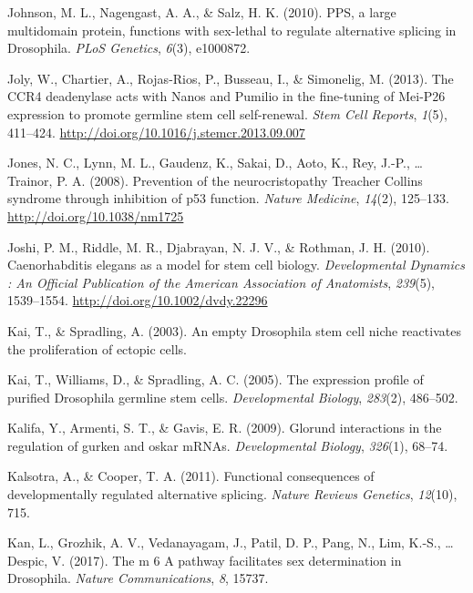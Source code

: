 \documentclass[12pt,twoside]{reedthesis}
\newlength{\cslhangindent}
\newenvironment{cslreferences}%
  {\setlength{\parindent}{0pt}%
  \everypar{\setlength{\hangindent}{\cslhangindent}}\ignorespaces}%
  {\par}
\begin{document}
\begin{cslreferences}
\leavevmode\hypertarget{ref-Johnson2010}{}%
Johnson, M. L., Nagengast, A. A., \& Salz, H. K. (2010). PPS, a large multidomain protein, functions with sex-lethal to regulate alternative splicing in Drosophila. \emph{PLoS Genetics}, \emph{6}(3), e1000872.

\leavevmode\hypertarget{ref-Joly2013f}{}%
Joly, W., Chartier, A., Rojas-Rios, P., Busseau, I., \& Simonelig, M. (2013). The CCR4 deadenylase acts with Nanos and Pumilio in the fine-tuning of Mei-P26 expression to promote germline stem cell self-renewal. \emph{Stem Cell Reports}, \emph{1}(5), 411--424. \url{http://doi.org/10.1016/j.stemcr.2013.09.007}

\leavevmode\hypertarget{ref-jonesPreventionNeurocristopathyTreacher2008}{}%
Jones, N. C., Lynn, M. L., Gaudenz, K., Sakai, D., Aoto, K., Rey, J.-P., \ldots{} Trainor, P. A. (2008). Prevention of the neurocristopathy Treacher Collins syndrome through inhibition of p53 function. \emph{Nature Medicine}, \emph{14}(2), 125--133. \url{http://doi.org/10.1038/nm1725}

\leavevmode\hypertarget{ref-Joshi2010l}{}%
Joshi, P. M., Riddle, M. R., Djabrayan, N. J. V., \& Rothman, J. H. (2010). Caenorhabditis elegans as a model for stem cell biology. \emph{Developmental Dynamics : An Official Publication of the American Association of Anatomists}, \emph{239}(5), 1539--1554. \url{http://doi.org/10.1002/dvdy.22296}

\leavevmode\hypertarget{ref-kaiEmptyDrosophilaStem2003}{}%
Kai, T., \& Spradling, A. (2003). An empty Drosophila stem cell niche reactivates the proliferation of ectopic cells.

\leavevmode\hypertarget{ref-Kai2005}{}%
Kai, T., Williams, D., \& Spradling, A. C. (2005). The expression profile of purified Drosophila germline stem cells. \emph{Developmental Biology}, \emph{283}(2), 486--502.

\leavevmode\hypertarget{ref-Kalifa2009}{}%
Kalifa, Y., Armenti, S. T., \& Gavis, E. R. (2009). Glorund interactions in the regulation of gurken and oskar mRNAs. \emph{Developmental Biology}, \emph{326}(1), 68--74.

\leavevmode\hypertarget{ref-Kalsotra2011}{}%
Kalsotra, A., \& Cooper, T. A. (2011). Functional consequences of developmentally regulated alternative splicing. \emph{Nature Reviews Genetics}, \emph{12}(10), 715.

\leavevmode\hypertarget{ref-Kan2017}{}%
Kan, L., Grozhik, A. V., Vedanayagam, J., Patil, D. P., Pang, N., Lim, K.-S., \ldots{} Despic, V. (2017). The m 6 A pathway facilitates sex determination in Drosophila. \emph{Nature Communications}, \emph{8}, 15737.


\end{cslreferences}
\end{document}
